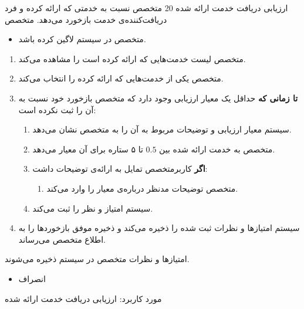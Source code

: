 {
\usecase
{
	ارزیابی دریافت خدمت ارائه شده
}
{20}
{
	متخصص نسبت به خدمتی که ارائه کرده و فرد دریافت‌کننده‌ی خدمت بازخورد می‌دهد.
}
{
	متخصص
}
{}
{
	\begin{itemize}
		\vspace*{-0.6cm}
		\item 
		متخصص در سیستم لاگین کرده باشد.
	\end{itemize}
}
{
	\vspace*{-0.6cm}
	\begin{enumerate}
		\item 
		متخصص لیست خدمت‌هایی که ارائه کرده است را مشاهده می‌کند.
		\item
		متخصص یکی از خدمت‌هایی که ارائه کرده را انتخاب می‌کند.
		\item
		\textbf{تا زمانی که} حداقل یک معیار ارزیابی وجود دارد که متخصص بازخورد خود نسبت به آن را ثبت نکرده است:
		
		\begin{enumerate}[label=\theenumi.\arabic*.]
			\item
			سیستم معیار ارزیابی و توضیحات مربوط به آن را به متخصص نشان می‌دهد.
			\item 
			متخصص به خدمت ارائه شده بین $0.5$ تا ۵ ستاره برای آن معیار می‌دهد.
			\item 
			\textbf{اگر} کاربرمتخصص تمایل به ارائه‌ی توضیحات داشت:
			\begin{enumerate}
				\item 
				متخصص توضیحات مدنظر درباره‌ی معیار را وارد می‌کند. 
			\end{enumerate}
			\item 
			سیستم امتیاز و نظر را ثبت می‌کند.
		\end{enumerate}
		\item
		سیستم امتیازها و نظرات ثبت شده را ذخیره می‌کند و ذخیره موفق بازخوردها را به اطلاع متخصص می‌رساند.
		
	\end{enumerate}
}
{
	امتیازها و نظرات متخصص در سیستم ذخیره می‌شوند.
}
{
	\begin{itemize}
		\vspace*{-0.6cm}
		\item 
		انصراف
	\end{itemize}
}
{
	مورد کاربرد: ارزیابی دریافت خدمت ارائه شده
}




}
